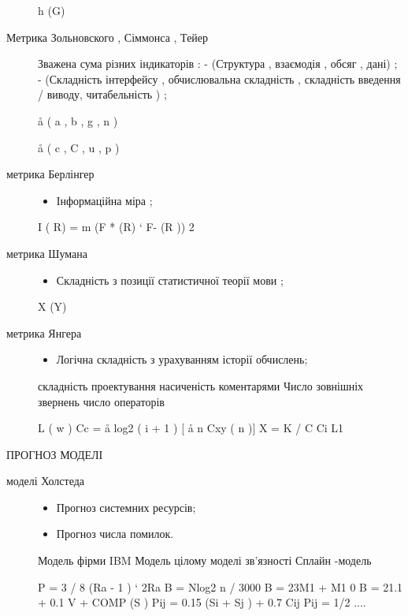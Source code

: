 \documentclass[oneside,final,14pt]{extreport}
\begin{document}
\begin{description}
h (G)

\item[{Метрика Зольновского , Сіммонса , Тейер}] \leavevmode
Зважена сума різних індикаторів :
- (Структура , взаємодія , обсяг , дані) ;
- (Складність інтерфейсу , обчислювальна складність , складність введення / виводу, читабельність ) ;

å ( a , b , g , n )

å ( c , C , u , p )

\item[{метрика Берлінгер}] \leavevmode\begin{itemize}
\item {} 
Інформаційна міра ;

\end{itemize}

I ( R) = m (F * (R) ` F- (R )) 2

\item[{метрика Шумана}] \leavevmode\begin{itemize}
\item {} 
Складність з позиції статистичної теорії мови ;

\end{itemize}

X (Y)

\item[{метрика Янгера}] \leavevmode\begin{itemize}
\item {} 
Логічна складність з урахуванням історії обчислень;

\end{itemize}

складність проектування
насиченість коментарями
Число зовнішніх звернень
число операторів

L ( w )
Cc = å log2 ( i + 1 ) {[} å n Cxy ( n ){]}
X = K / C
Ci
L1

\end{description}

ПРОГНОЗ МОДЕЛІ
\begin{description}
\item[{моделі Холстеда}] \leavevmode\begin{itemize}
\item {} 
Прогноз системних ресурсів;

\item {} 
Прогноз числа помилок.

\end{itemize}

Модель фірми IBM
Модель цілому
моделі зв'язності
Сплайн -модель

P = 3 / 8 (Ra - 1 ) ` 2Ra
B = Nlog2 n / 3000
B = 23M1 + M1 0
B = 21.1 + 0.1 V + COMP (S )
Pij = 0.15 (Si + Sj ) + 0.7 Cij
Pij = 1/2 ....

\end{description}
\end{document}
